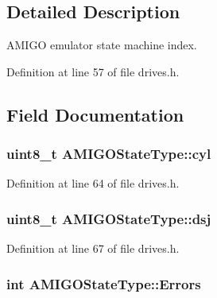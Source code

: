 \subsection{Detailed Description}
A\+M\+I\+GO emulator state machine index. 

Definition at line 57 of file drives.\+h.



\subsection{Field Documentation}
\subsubsection[{\texorpdfstring{cyl}{cyl}}]{\setlength{\rightskip}{0pt plus 5cm}uint8\+\_\+t A\+M\+I\+G\+O\+State\+Type\+::cyl}\hypertarget{structAMIGOStateType_a54b4a4f8221f9d38fb93f2d23a40e305}{}\label{structAMIGOStateType_a54b4a4f8221f9d38fb93f2d23a40e305}


Definition at line 64 of file drives.\+h.

\subsubsection[{\texorpdfstring{dsj}{dsj}}]{\setlength{\rightskip}{0pt plus 5cm}uint8\+\_\+t A\+M\+I\+G\+O\+State\+Type\+::dsj}\hypertarget{structAMIGOStateType_ab2294deecb44cdb1675e4096dba22eb1}{}\label{structAMIGOStateType_ab2294deecb44cdb1675e4096dba22eb1}


Definition at line 67 of file drives.\+h.

\subsubsection[{\texorpdfstring{Errors}{Errors}}]{\setlength{\rightskip}{0pt plus 5cm}int A\+M\+I\+G\+O\+State\+Type\+::\+Errors}\hypertarget{structAMIGOStateType_ad04b5b3ffd8fabff547e6498d534feac}{}\label{structAMIGOStateType_ad04b5b3ffd8fabff547e6498d534feac}


